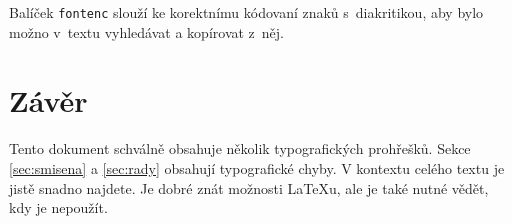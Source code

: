 \documentclass[a4paper, 10pt, twocolumn]{article}
\begin{document}
Balíček \verb|fontenc| slouží ke korektnímu kódovaní znaků s~diakritikou, aby bylo možno v~textu vyhledávat a kopírovat z~něj.
\section{Závěr}\label{sec:zaver}
Tento dokument schválně obsahuje několik typografických prohřešků. Sekce \ref{sec:smisena} a \ref{sec:rady} obsahují typografické chyby. V kontextu celého textu je jistě snadno najdete. Je dobré znát možnosti \LaTeX u, ale je také nutné vědět, kdy je nepoužít.
\end{document}
